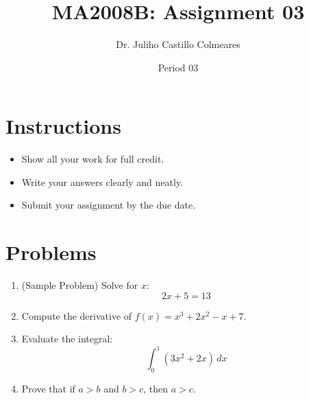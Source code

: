 \documentclass[12pt]{article}
\title{MA2008B: Assignment 03}
\author{Dr. Juliho Castillo Colmeares}
\date{Period 03}
\begin{document}
\maketitle

\section*{Instructions}
\begin{itemize}
    \item Show all your work for full credit.
    \item Write your answers clearly and neatly.
    \item Submit your assignment by the due date.
\end{itemize}

\section*{Problems}

\begin{enumerate}[label=\textbf{Problem \arabic*.}]
    \item (Sample Problem) Solve for $x$:
    \[
        2x + 5 = 13
    \]
    \vspace{2cm}

    \item Compute the derivative of $f(x) = x^3 + 2x^2 - x + 7$.
    \vspace{2cm}

    \item Evaluate the integral:
    \[
        \int_0^1 (3x^2 + 2x)\,dx
    \]
    \vspace{2cm}

    \item Prove that if $a > b$ and $b > c$, then $a > c$.
    \vspace{2cm}
\end{enumerate}
\end{document}
